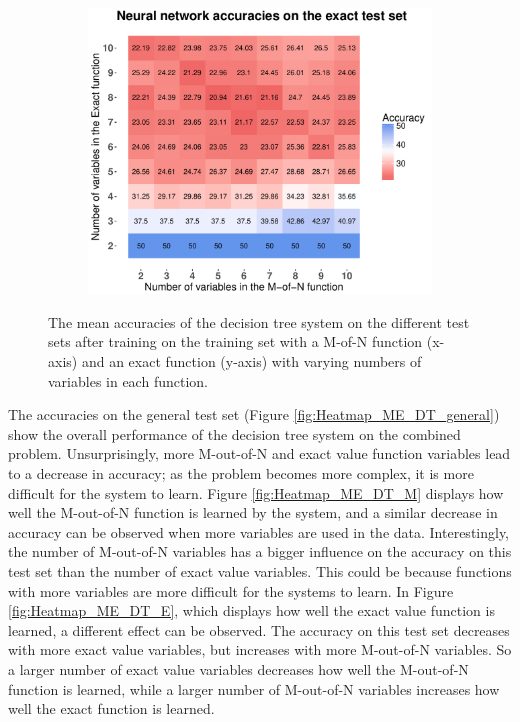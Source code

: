 \documentclass[letterpaper]{article} %
\begin{document}
\begin{figure}
   \begin{subfigure}[t]{0.45\textwidth}
        \includegraphics[width = 1 \linewidth]{Figures/Heatmap_ME_NN_E.pdf}
		\caption{}       
        \label{fig:Heatmap_ME_NN_E}
    \end{subfigure}%
    \caption{The mean accuracies of the decision tree system on the different test sets after training on the training set with a M-of-N function (x-axis) and an exact function (y-axis) with varying numbers of variables in each function.}
    \label{fig:Heatmap_NN_ME}
\end{figure}

The accuracies on the general test set (Figure \ref{fig:Heatmap_ME_DT_general}) show the overall performance of the decision tree system on the combined problem. Unsurprisingly, more M-out-of-N and exact value function variables lead to a decrease in accuracy; as the problem becomes more complex, it is more difficult for the system to learn. Figure \ref{fig:Heatmap_ME_DT_M} displays how well the M-out-of-N function is learned by the system, and a similar decrease in accuracy can be observed when more variables are used in the data. Interestingly, the number of M-out-of-N variables has a bigger influence on the accuracy on this test set than the number of exact value variables. This could be because functions with more variables are more difficult for the systems to learn. In Figure \ref{fig:Heatmap_ME_DT_E}, which displays how well the exact value function is learned, a different effect can be observed. The accuracy on this test set decreases with more exact value variables, but increases with more M-out-of-N variables. So a larger number of
exact value variables decreases how well the M-out-of-N function is learned, while a larger number of M-out-of-N variables increases how well the exact function is learned. 
\end{document}
